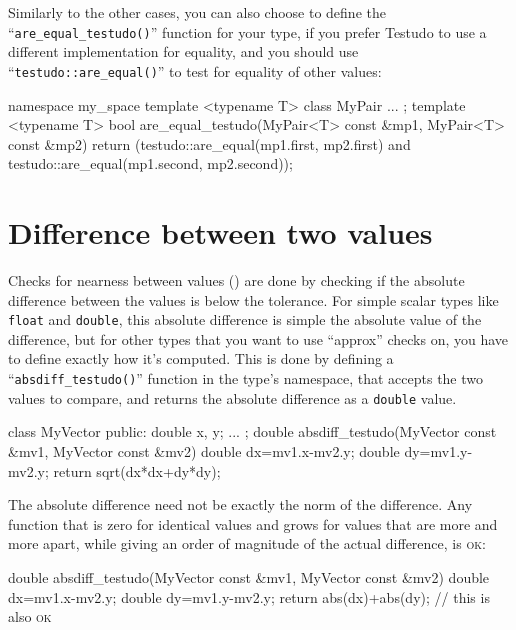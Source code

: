 \documentclass[twoside, a4paper, article]{memoir}
\begin{document}
Similarly to the other cases, you can also choose to define the
``\texttt{are\_equal\_testudo()}'' function for your type, if you prefer
Testudo to use a different implementation for equality, and you should use
``\texttt{testudo::are\_equal()}'' to test for equality of other values:
\begin{cpplisting}
namespace my_space {
  template <typename T>
  class MyPair { ... };
  template <typename T>
  bool are_equal_testudo(MyPair<T> const &mp1,
                         MyPair<T> const &mp2) {
    return (testudo::are_equal(mp1.first, mp2.first)
             and testudo::are_equal(mp1.second, mp2.second));
  }
}
\end{cpplisting}

\section{Difference between two values}
\label{sec:difference-between-two-values}

Checks for nearness between values ()
are done by checking if the absolute difference between the values is below the
tolerance.  For simple scalar types like \texttt{float} and \texttt{double},
this absolute difference is simple the absolute value of the difference, but
for other types that you want to use ``approx'' checks on, you have to define
exactly how it's computed.  This is done by defining a
``\texttt{absdiff\_testudo()}'' function in the type's namespace, that accepts
the two values to compare, and returns the absolute difference as a
\texttt{double} value.
\begin{cpplisting}
class MyVector {
public:
  double x, y;
  ...
};
double absdiff_testudo(MyVector const &mv1,
                       MyVector const &mv2) {
  double dx=mv1.x-mv2.y;
  double dy=mv1.y-mv2.y;
  return sqrt(dx*dx+dy*dy);
}
\end{cpplisting}

The absolute difference need not be exactly the norm of the difference.  Any
function that is zero for identical values and grows for values that are more
and more apart, while giving an order of magnitude of the actual difference, is
\textsc{ok}:
\begin{cpplisting}
double absdiff_testudo(MyVector const &mv1,
                       MyVector const &mv2) {
  double dx=mv1.x-mv2.y;
  double dy=mv1.y-mv2.y;
  return abs(dx)+abs(dy); // this is also \textsc{ok}
}
\end{cpplisting}
\end{document}

